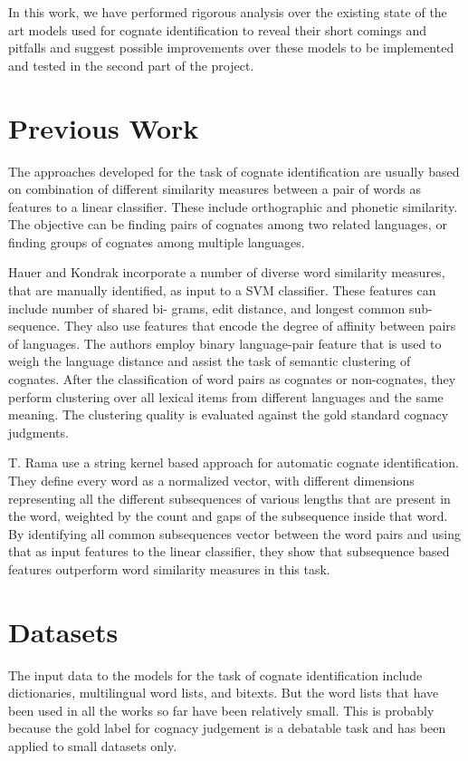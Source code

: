\documentclass[journal]{IEEEtran}
\begin{document}
In this work, we have performed rigorous analysis over the existing state of the art models used for cognate identification to reveal their short comings and pitfalls and suggest possible improvements over these models to be implemented and tested in the second part of the project.

\section{Previous Work}

The approaches developed for the task of cognate identification are usually based on combination of different similarity measures between a pair of words as features to a linear classifier. These include orthographic and phonetic similarity. The objective can be finding pairs of cognates among two related languages, or finding groups of cognates among multiple languages.

Hauer and Kondrak \cite{hauer2011clustering} incorporate a number of diverse word similarity measures, that are manually identified, as input to a SVM classifier. These features can include number of shared bi- grams, edit distance, and longest common sub-sequence. They also use features that encode the degree of affinity between pairs of languages. The authors employ binary language-pair feature that is used to weigh the language distance and assist the task of semantic clustering of cognates. After the classification of word pairs as cognates or non-cognates, they perform clustering over all lexical items from different languages and the same meaning. The clustering quality is evaluated against the gold standard cognacy judgments.

T. Rama \cite{rama2015automatic} use a string kernel based approach for automatic cognate identification. They define every word as a normalized vector, with different dimensions representing all the different subsequences of various lengths that are present in the word, weighted by the count and gaps of the subsequence inside that word. By identifying all common subsequences vector between the word pairs and using that as input features to the linear classifier, they show that subsequence based features outperform word similarity measures in this task.

\section{Datasets}
The input data to the models for the task of cognate identification include dictionaries, multilingual word lists, and bitexts. But the word lists that have been used in all the works so far have been relatively small. This is probably because the gold label for cognacy judgement is a debatable task and has been applied to small datasets only. 
\end{document}
